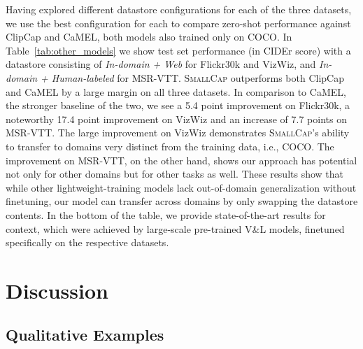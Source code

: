 \documentclass[10pt,twocolumn,letterpaper]{article}
\newcommand{\model}{\textsc{SmallCap}\xspace}
\begin{document}
Having explored different datastore configurations for each of the three datasets, we use the best configuration for each to compare zero-shot performance against ClipCap and CaMEL, both models also trained only on COCO. In Table~\ref{tab:other_models} we show test set performance (in CIDEr score) with a datastore consisting of \emph{In-domain + Web} for Flickr30k and VizWiz, and \emph{In-domain + Human-labeled} for MSR-VTT. \model outperforms both ClipCap and CaMEL by a large margin on all three datasets. In comparison to CaMEL, the stronger baseline of the two, we see a 5.4 point improvement on Flickr30k, a noteworthy 17.4 point improvement on VizWiz and an increase of 7.7 points on MSR-VTT. The large improvement on VizWiz demonstrates \model's ability to transfer to domains very distinct from the training data, i.e., COCO. The improvement on MSR-VTT, on the other hand, shows our approach has potential not only for other domains but for other tasks as well. These results show that while other lightweight-training models lack out-of-domain generalization without finetuning, our model can transfer across domains by only swapping the datastore contents. In the bottom of the table, we provide state-of-the-art results for context, which were achieved by large-scale pre-trained V\&L models, finetuned specifically on the respective datasets.   

\section{Discussion}

\subsection{Qualitative Examples}
\end{document}
